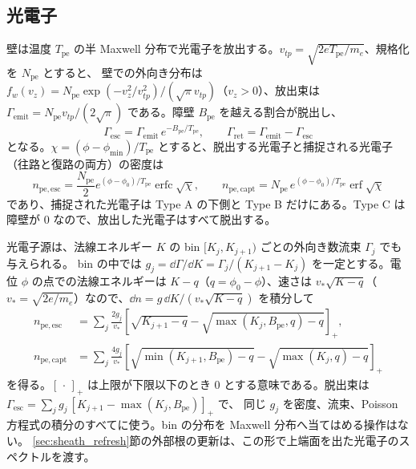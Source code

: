 \subsection{光電子}
壁は温度 $T_{\mathrm{pe}}$ の半 Maxwell 分布で光電子を放出する。$v_{tp}=\sqrt{2eT_{\mathrm{pe}}/m_e}$、規格化を $N_{\mathrm{pe}}$ とすると、
壁での外向き分布は $f_w(v_z)=N_{\mathrm{pe}}\exp(-v_z^2/v_{tp}^2)/(\sqrt\pi v_{tp})$（$v_z>0$）、放出束は
$\Gamma_{\mathrm{emit}}=N_{\mathrm{pe}}v_{tp}/(2\sqrt\pi)$ である。障壁 $B_{\mathrm{pe}}$ を越える割合が脱出し、
\begin{equation}
 \Gamma_{\mathrm{esc}}=\Gamma_{\mathrm{emit}}\,e^{-B_{\mathrm{pe}}/T_{\mathrm{pe}}},\qquad
 \Gamma_{\mathrm{ret}}=\Gamma_{\mathrm{emit}}-\Gamma_{\mathrm{esc}}
 \label{eq:sm_pe_flux}
\end{equation}
となる。$\chi=(\phi-\phi_{\min})/T_{\mathrm{pe}}$ とすると、脱出する光電子と捕捉される光電子（往路と復路の両方）の密度は
\begin{equation}
 n_{\mathrm{pe,esc}}=\frac{N_{\mathrm{pe}}}2e^{(\phi-\phi_0)/T_{\mathrm{pe}}}\operatorname{erfc}\sqrt\chi,\qquad
 n_{\mathrm{pe,capt}}=N_{\mathrm{pe}}\,e^{(\phi-\phi_0)/T_{\mathrm{pe}}}\operatorname{erf}\sqrt\chi
 \label{eq:sm_pe_density}
\end{equation}
であり、捕捉された光電子は Type A の下側と Type B だけにある。Type C は障壁が 0 なので、放出した光電子はすべて脱出する。

光電子源は、法線エネルギー $K$ の bin $[K_j,K_{j+1})$ ごとの外向き数流束 $\Gamma_j$ でも与えられる。
bin の中では $g_j=\dd\Gamma/\dd K=\Gamma_j/(K_{j+1}-K_j)$ を一定とする。電位 $\phi$ の点での法線エネルギーは
$K-q$（$q=\phi_0-\phi$）、速さは $v_*\sqrt{K-q}$（$v_*=\sqrt{2e/m_e}$）なので、$\dd n=g\,\dd K/(v_*\sqrt{K-q})$ を積分して
\begin{align}
 n_{\mathrm{pe,esc}}&=\sum_j\frac{2g_j}{v_*}\left[\sqrt{K_{j+1}-q}-\sqrt{\max(K_j,B_{\mathrm{pe}},q)-q}\right]_+,\nonumber\\
 n_{\mathrm{pe,capt}}&=\sum_j\frac{4g_j}{v_*}\left[\sqrt{\min(K_{j+1},B_{\mathrm{pe}})-q}-\sqrt{\max(K_j,q)-q}\right]_+
 \label{eq:sm_pe_bins}
\end{align}
を得る。$[\,\cdot\,]_+$ は上限が下限以下のとき 0 とする意味である。脱出束は $\Gamma_{\mathrm{esc}}=\sum_jg_j\,[K_{j+1}-\max(K_j,B_{\mathrm{pe}})]_+$ で、
同じ $g_j$ を密度、流束、Poisson 方程式の積分のすべてに使う。bin の分布を Maxwell 分布へ当てはめる操作はない。
\ref{sec:sheath_refresh}節の外部根の更新は、この形で上端面を出た光電子のスペクトルを渡す。

